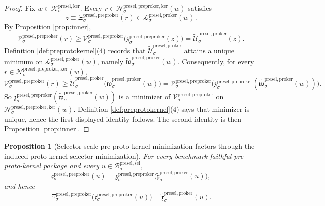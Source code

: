 \documentclass[11pt]{article}
\newcommand{\PreSectionSelectorBody}[1]{\mathcal B_{#1}^{\mathrm{presel,sel}}}
\newcommand{\KernelBody}[1]{\mathcal K_{#1}^{\mathrm{presel,ker}}}
\newcommand{\ProtoKernelKernelFiber}[2]{\mathcal L_{#1}^{\mathrm{presel,proker}}(#2)}
\newcommand{\PreProtoKernelProj}[1]{\Xi_{#1}^{\mathrm{presel,preproker}}}
\newcommand{\PreProtoKernelFunctional}[1]{\mathscr V_{#1}^{\mathrm{presel,preproker}}}
\newcommand{\PreProtoKernelMinLift}[1]{\mathfrak z_{#1}^{\mathrm{presel,preproker}}}
\newcommand{\PreProtoKernelKernelFiber}[2]{\mathcal N_{#1}^{\mathrm{presel,preproker,ker}}(#2)}
\newcommand{\PreProtoKernelSelectorMin}[1]{\mathfrak c_{#1}^{\mathrm{presel,preproker}}}
\newcommand{\InducedProtoKernelFunctional}[1]{\widetilde{\mathscr U}_{#1}^{\mathrm{presel,proker}}}
\newcommand{\InducedProtoKernelKernelMin}[1]{\widetilde{\mathfrak w}_{#1}^{\mathrm{presel,proker}}}
\newcommand{\InducedProtoKernelSelectorMin}[1]{\widetilde{\mathfrak x}_{#1}^{\mathrm{presel,proker}}}
\newtheorem{proposition}{Proposition}
\begin{document}
\begin{proof}
Fix \(w\in\KernelBody{\sigma}\). Every \(r\in\PreProtoKernelKernelFiber{\sigma}{w}\) satisfies
\[
z\equiv\PreProtoKernelProj{\sigma}(r)\in\ProtoKernelKernelFiber{\sigma}{w}.
\]
By Proposition \ref{prop:inner},
\[
\PreProtoKernelFunctional{\sigma}(r)
\geq
\PreProtoKernelFunctional{\sigma}\bigl(\PreProtoKernelMinLift{\sigma}(z)\bigr)
=
\InducedProtoKernelFunctional{\sigma}(z).
\]
Definition \ref{def:preprotokernel}(4) records that \(\InducedProtoKernelFunctional{\sigma}\) attains a unique minimum on \(\ProtoKernelKernelFiber{\sigma}{w}\), namely \(\InducedProtoKernelKernelMin{\sigma}(w)\). Consequently, for every \(r\in\PreProtoKernelKernelFiber{\sigma}{w}\),
\[
\PreProtoKernelFunctional{\sigma}(r)
\geq
\InducedProtoKernelFunctional{\sigma}\bigl(\InducedProtoKernelKernelMin{\sigma}(w)\bigr)
=
\PreProtoKernelFunctional{\sigma}\bigl(\PreProtoKernelMinLift{\sigma}(\InducedProtoKernelKernelMin{\sigma}(w))\bigr).
\]
So \(\PreProtoKernelMinLift{\sigma}(\InducedProtoKernelKernelMin{\sigma}(w))\) is a minimizer of \(\PreProtoKernelFunctional{\sigma}\) on \(\PreProtoKernelKernelFiber{\sigma}{w}\). Definition \ref{def:preprotokernel}(4) says that minimizer is unique, hence the first displayed identity follows. The second identity is then Proposition \ref{prop:inner}.
\end{proof}

\begin{proposition}[Selector-scale pre-proto-kernel minimization factors through the induced proto-kernel selector minimization]
\label{prop:selectorfactor}
For every benchmark-faithful pre-proto-kernel package and every \(u\in\PreSectionSelectorBody{\sigma}\),
\[
\PreProtoKernelSelectorMin{\sigma}(u)
=
\PreProtoKernelMinLift{\sigma}\bigl(\InducedProtoKernelSelectorMin{\sigma}(u)\bigr),
\]
and hence
\[
\PreProtoKernelProj{\sigma}\bigl(\PreProtoKernelSelectorMin{\sigma}(u)\bigr)
=
\InducedProtoKernelSelectorMin{\sigma}(u).
\]
\end{proposition}
\end{document}
